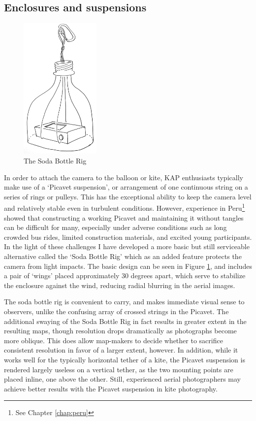 \documentclass[11pt,oneside,notitlepage]{report}
\begin{document}
\subsection{Enclosures and suspensions}
\label{subsec:cameraenclosures}

\begin{figure}
	\label{fig:soda}
	\begin{flushright}
		\includegraphics[width=0.35\textwidth]{images/soda-bottle-overview.jpg}
		\caption{The Soda Bottle Rig}
	\end{flushright}
\end{figure}

In order to attach the camera to the balloon or kite, \ac{KAP} enthusiasts typically make use of a `Picavet suspension', or arrangement of one continuous string on a series of rings or pulleys. This has the exceptional ability to keep the camera level and relatively stable even in turbulent conditions. However, experience in Peru\footnote{See Chapter \ref{chap:peru}} showed that constructing a working Picavet and maintaining it without tangles can be difficult for many, especially under adverse conditions such as long crowded bus rides, limited construction materials, and excited young participants. In the light of these challenges I have developed a more basic but still serviceable alternative called the `Soda Bottle Rig' which as an added feature protects the camera from light impacts. The basic design can be seen in Figure \ref{fig:soda}, and includes a pair of `wings' placed approximately 30 degrees apart, which serve to stabilize the enclosure against the wind, reducing radial blurring in the aerial images.

The soda bottle rig is convenient to carry, and makes immediate visual sense to observers, unlike the confusing array of crossed strings in the Picavet. The additional swaying of the Soda Bottle Rig in fact results in greater extent in the resulting maps, though resolution drops dramatically as photographs become more oblique. This does allow map-makers to decide whether to sacrifice consistent resolution in favor of a larger extent, however. In addition, while it works well for the typically horizontal tether of a kite, the Picavet suspension is rendered largely useless on a vertical tether, as the two mounting points are placed inline, one above the other. Still, experienced aerial photographers may achieve better results with the Picavet suspension in kite photography.  
\end{document}
